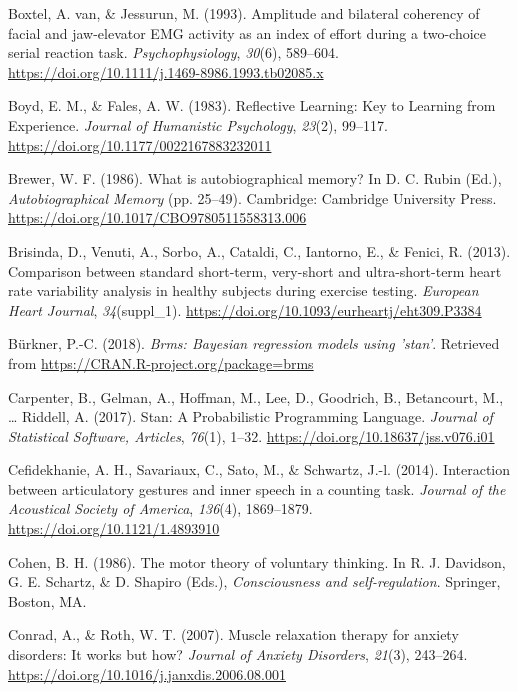\documentclass[a4paper,12pt,twoside,openright,oldfontcommands]{memoir}
\begin{document}
\hypertarget{ref-van_boxtel_amplitude_1993}{}
Boxtel, A. van, \& Jessurun, M. (1993). Amplitude and bilateral
coherency of facial and jaw-elevator EMG activity as an index of effort
during a two-choice serial reaction task. \emph{Psychophysiology},
\emph{30}(6), 589--604.
\url{https://doi.org/10.1111/j.1469-8986.1993.tb02085.x}

\hypertarget{ref-boyd_reflective_1983}{}
Boyd, E. M., \& Fales, A. W. (1983). Reflective Learning: Key to
Learning from Experience. \emph{Journal of Humanistic Psychology},
\emph{23}(2), 99--117. \url{https://doi.org/10.1177/0022167883232011}

\hypertarget{ref-rubin_what_1986}{}
Brewer, W. F. (1986). What is autobiographical memory? In D. C. Rubin
(Ed.), \emph{Autobiographical Memory} (pp. 25--49). Cambridge: Cambridge
University Press. \url{https://doi.org/10.1017/CBO9780511558313.006}

\hypertarget{ref-brisinda_comparison_2013}{}
Brisinda, D., Venuti, A., Sorbo, A., Cataldi, C., Iantorno, E., \&
Fenici, R. (2013). Comparison between standard short-term, very-short
and ultra-short-term heart rate variability analysis in healthy subjects
during exercise testing. \emph{European Heart Journal},
\emph{34}(suppl\_1).
\url{https://doi.org/10.1093/eurheartj/eht309.P3384}

\hypertarget{ref-R-brms}{}
Bürkner, P.-C. (2018). \emph{Brms: Bayesian regression models using
'stan'}. Retrieved from \url{https://CRAN.R-project.org/package=brms}

\hypertarget{ref-carpenter_stan:_2017}{}
Carpenter, B., Gelman, A., Hoffman, M., Lee, D., Goodrich, B.,
Betancourt, M., \ldots{} Riddell, A. (2017). Stan: A Probabilistic
Programming Language. \emph{Journal of Statistical Software, Articles},
\emph{76}(1), 1--32. \url{https://doi.org/10.18637/jss.v076.i01}

\hypertarget{ref-cefidekhanie_interaction_2014}{}
Cefidekhanie, A. H., Savariaux, C., Sato, M., \& Schwartz, J.-l. (2014).
Interaction between articulatory gestures and inner speech in a counting
task. \emph{Journal of the Acoustical Society of America},
\emph{136}(4), 1869--1879. \url{https://doi.org/10.1121/1.4893910}

\hypertarget{ref-cohen_motor_1986}{}
Cohen, B. H. (1986). The motor theory of voluntary thinking. In R. J.
Davidson, G. E. Schartz, \& D. Shapiro (Eds.), \emph{Consciousness and
self-regulation}. Springer, Boston, MA.

\hypertarget{ref-conrad_muscle_2007}{}
Conrad, A., \& Roth, W. T. (2007). Muscle relaxation therapy for anxiety
disorders: It works but how? \emph{Journal of Anxiety Disorders},
\emph{21}(3), 243--264.
\url{https://doi.org/10.1016/j.janxdis.2006.08.001}
\end{document}
